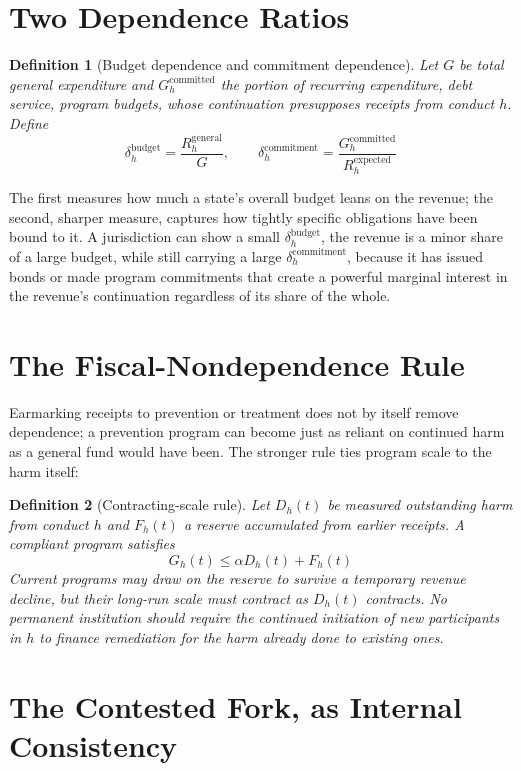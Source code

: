\documentclass[11pt]{article}
\newtheorem{definition}{Definition}[section]
\begin{document}
\section{Two Dependence Ratios}

\begin{definition}[Budget dependence and commitment dependence]
Let $G$ be total general expenditure and $G_h^{\text{committed}}$ the portion of recurring expenditure, debt service, program budgets, whose continuation presupposes receipts from conduct $h$. Define
\[
\delta_h^{\text{budget}} = \frac{R_h^{\text{general}}}{G}, \qquad \delta_h^{\text{commitment}} = \frac{G_h^{\text{committed}}}{R_h^{\text{expected}}}
\]
\end{definition}

The first measures how much a state's overall budget leans on the revenue; the second, sharper measure, captures how tightly specific obligations have been bound to it. A jurisdiction can show a small $\delta_h^{\text{budget}}$, the revenue is a minor share of a large budget, while still carrying a large $\delta_h^{\text{commitment}}$, because it has issued bonds or made program commitments that create a powerful marginal interest in the revenue's continuation regardless of its share of the whole.

\section{The Fiscal-Nondependence Rule}

Earmarking receipts to prevention or treatment does not by itself remove dependence; a prevention program can become just as reliant on continued harm as a general fund would have been. The stronger rule ties program scale to the harm itself:

\begin{definition}[Contracting-scale rule]
Let $D_h(t)$ be measured outstanding harm from conduct $h$ and $F_h(t)$ a reserve accumulated from earlier receipts. A compliant program satisfies
\[
G_h(t) \leq \alpha D_h(t) + F_h(t)
\]
Current programs may draw on the reserve to survive a temporary revenue decline, but their long-run scale must contract as $D_h(t)$ contracts. No permanent institution should require the continued initiation of new participants in $h$ to finance remediation for the harm already done to existing ones.
\end{definition}

\section{The Contested Fork, as Internal Consistency}
\end{document}
